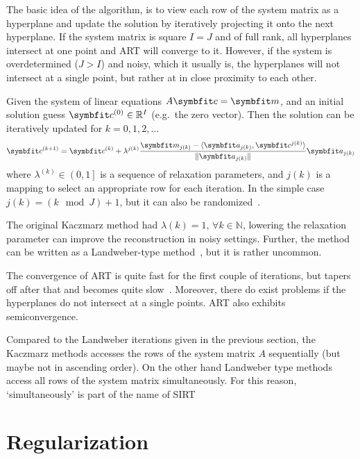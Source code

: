 The basic idea of the algorithm, is to view each row of the system matrix as a hyperplane and update
the solution by iteratively projecting it onto the next hyperplane. If the system matrix is square
\(I = J\) and of full rank, all hyperplanes intersect at one point and \gls{ART} will converge to
it. However, if the system is overdetermined (\(J > I\)) and noisy, which it usually is, the
hyperplanes will not intersect at a single point, but rather at in close proximity to each other.

\begin{definition}\label{def:art}
	Given the system of linear equations \(A\mvec{c} = \mvec{m}\), and an initial solution guess
	\(\mvec{c}^{(0)} \in \mathbb{R}^I\) (e.g.\ the zero vector). Then the solution can be
	iteratively updated for \(k = 0, 1, 2, \dots\)
	\[
		\mvec{c}^{(k+1)} = \mvec{c}^{(k)} + \lambda^{j(k)} \frac{\mvec{m}_{j(k)} - \langle \mvec{a}_{j(k)}, \mvec{c}^{j(k)} \rangle}{\norm{\mvec{a}_{j(k)}}}\mvec{a}_{j(k)}
	\]
	where \(\lambda^{(k)} \in \left(0, 1\right]\) is a sequence of relaxation parameters, and
	\(j(k)\) is a mapping to select an appropriate row for each iteration. In the simple case
	\(j(k) = (k \mod J) + 1\), but it can also be randomized~\cite{strohmer_randomized_2007}.
\end{definition}

The original Kaczmarz method had \(\lambda(k) = 1\), \(\forall k \in \mathbb{N}\), lowering the
relaxation parameter can improve the reconstruction in noisy settings. Further, the method can be
written as a Landweber-type method~\cite{hansen_discrete_2010}, but it is rather uncommon.

The convergence of \gls{ART} is quite fast for the first couple of iterations, but tapers off after
that and becomes quite slow~\cite{hansen_discrete_2010}. Moreover, there do exist problems if the
hyperplanes do not intersect at a single points. \gls{ART} also exhibits semiconvergence.

Compared to the Landweber iterations given in the previous section, the Kaczmarz methods accesses
the rows of the system matrix \(A\) sequentially (but maybe not in ascending order). On the other
hand Landweber type methods access all rows of the system matrix simultaneously. For this reason,
`simultaneously' is part of the name of SIRT

\section{Regularization}\label{sec:regularization}

